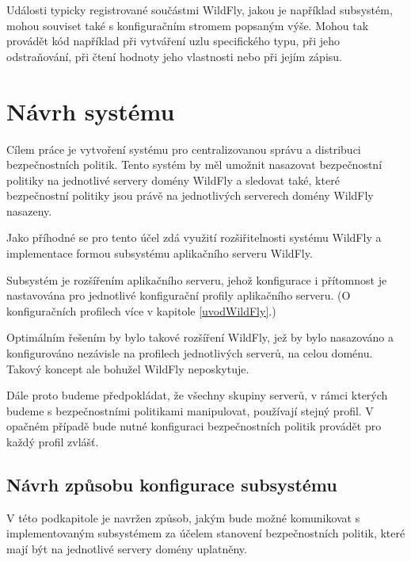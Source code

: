 Události typicky registrované součástmi WildFly, jakou je například subsystém, mohou souviset také s konfiguračním stromem popsaným výše.
Mohou tak provádět kód například při vytváření uzlu specifického typu, při jeho odstraňování, při čtení hodnoty jeho vlastnosti nebo při jejím zápisu.
\cite{WildFlyExtending}

\chapter{Návrh systému} \label{navrh}

Cílem práce je vytvoření systému pro centralizovanou správu a distribuci bezpečnostních politik.
Tento systém by měl umožnit nasazovat bezpečnostní politiky na jednotlivé servery domény WildFly a sledovat také,
které bezpečnostní politiky jsou právě na jednotlivých serverech domény WildFly nasazeny.

Jako příhodné se pro tento účel zdá využití rozšiřitelnosti systému WildFly a implementace formou subsystému aplikačního serveru WildFly.

Subsystém je rozšířením aplikačního serveru, jehož konfigurace i přítomnost je nastavována pro jednotlivé konfigurační profily aplikačního serveru.
(O konfiguračních profilech více v kapitole \ref{uvodWildFly}.)

Optimálním řešením by bylo takové rozšíření WildFly, jež by bylo nasazováno a konfigurováno nezávisle na profilech jednotlivých serverů, na celou doménu.
Takový koncept ale bohužel WildFly neposkytuje.

Dále proto budeme předpokládat, že všechny skupiny serverů, v rámci kterých budeme s bezpečnostními politikami manipulovat, používají stejný profil.
V opačném případě bude nutné konfiguraci bezpečnostních politik provádět pro každý profil zvlášť.

\section{Návrh způsobu konfigurace subsystému} \label{zpusobNastaveniJBoss}

V této podkapitole je navržen způsob, jakým bude možné komunikovat s implementovaným subsystémem za účelem stanovení bezpečnostních politik, které mají být na jednotlivé servery domény uplatněny.

